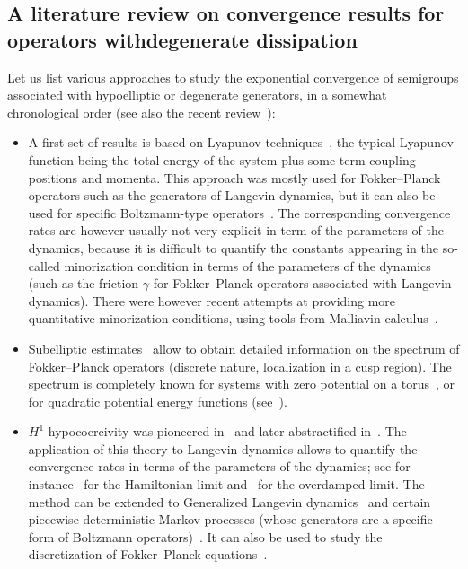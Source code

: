 \documentclass[10pt]{amsart}
\theoremstyle{definition}\newtheorem{defi}[theo]{Definition}\newtheorem{rema}[theo]{Remark}\newtheorem{exam}[theo]{Example}\newtheorem{exem}[theo]{Example}\newtheorem{nota}[theo]{Notation}
\begin{document}
\subsection*{A literature review on convergence results for operators with\linebreak degenerate dissipation}
Let us list various approaches to study the exponential convergence of semigroups associated with hypoelliptic or degenerate generators, in a somewhat chronological order (see also the recent review~\cite{Herau16}):
\begin{itemize}
\item A first set of results is based on Lyapunov techniques~\cite{MSH02,rey-bellet,Wu01}, the typical Lyapunov function being the total energy of the system plus some term coupling positions and momenta. This approach was mostly used for Fokker--Planck operators such as the generators of Langevin dynamics, but it can also be used for specific Boltzmann-type operators~\cite{BRSS17,CCEY19,CELMM}. The corresponding convergence rates are however usually not very explicit in term of the parameters of the dynamics, because it is difficult to quantify the constants appearing in the so-called minorization condition in terms of the parameters of the dynamics (such as the friction $\gamma$ for Fokker--Planck operators associated with Langevin dynamics). There were however recent attempts at providing more quantitative minorization conditions, using tools from Malliavin calculus~\cite{Ev18}.

\item Subelliptic estimates~\cite{EH03,HN04,HN05} allow to obtain detailed information on the spectrum of Fokker--Planck operators (discrete nature, localization in a cusp region). The spectrum is completely known for systems with zero potential on a torus~\cite{Kozlov89}, or for quadratic potential energy functions (see~\cite{MPP02,PavliotisBook}).

\item $H^1$ hypocoercivity was pioneered in~\cite{MN06,Talay02} and later abstractified in~\cite{Villani09}. The application of this theory to Langevin dynamics allows to quantify the convergence rates in terms of the parameters of the dynamics; see for instance~\cite{HP08} for the Hamiltonian limit and~\cite{LMS16,LS16} for the overdamped limit. The method can be extended to Generalized Langevin dynamics~\cite{OP11} and certain piecewise deterministic Markov processes (whose generators are a specific form of Boltzmann operators)~\cite{DPD18}. It can also be used to study the discretization of Fokker--Planck equations~\cite{DHL19,Georg18}.


\end{itemize}
\end{document}
